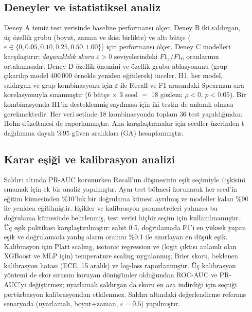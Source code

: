 \documentclass[conference]{IEEEtran}
\begin{document}
\subsection{Deneyler ve istatistiksel analiz}
Deney A temiz test verisinde baseline performansı ölçer. Deney B iki saldırgan, üç özellik grubu (boyut, zaman ve ikisi birlikte) ve altı bütçe ($\varepsilon \in \{0, 0.05, 0.10, 0.25, 0.50, 1.00\}$) için performansı ölçer. Deney C modelleri karşılaştırır; \emph{dayanıklılık skoru} $\varepsilon>0$ seviyelerindeki $F1_\varepsilon / F1_0$ oranlarının ortalamasıdır. Deney D özellik önemini ve özellik grubu ablasyonunu (grup çıkarılıp model 400\,000 örnekle yeniden eğitilerek) inceler. H1, her model, saldırgan ve grup kombinasyonu için $\varepsilon$ ile Recall ve F1 arasındaki Spearman sıra korelasyonuyla sınanmıştır (6 bütçe $\times$ 3 seed $=$ 18 gözlem; $\rho<0$, $p<0.05$). Bir kombinasyonda H1'in desteklenmiş sayılması için iki testin de anlamlı olması gerekmektedir. Her veri setinde 18 kombinasyonda toplam 36 test yapıldığından Holm düzeltmesi de raporlanmıştır. Ana karşılaştırmalar için seedler üzerinden t dağılımına dayalı \%95 güven aralıkları (GA) hesaplanmıştır.

\subsection{Karar eşiği ve kalibrasyon analizi}
Saldırı altında PR-AUC korunurken Recall'un düşmesinin eşik seçimiyle ilişkisini sınamak için ek bir analiz yapılmıştır. Aynı test bölmesi korunarak her seed'in eğitim kümesinden \%10'luk bir doğrulama kümesi ayrılmış ve modeller kalan \%90 ile yeniden eğitilmiştir. Eşikler ve kalibrasyon parametreleri yalnızca bu doğrulama kümesinde belirlenmiş, test verisi hiçbir seçim için kullanılmamıştır. Üç eşik politikası karşılaştırılmıştır: sabit 0.5, doğrulamada F1'i en yüksek yapan eşik ve doğrulamada yanlış alarm oranını \%0.1 ile sınırlayan en düşük eşik. Kalibrasyon için Platt scaling, isotonic regression ve (logit çıktısı anlamlı olan XGBoost ve MLP için) temperature scaling uygulanmış; Brier skoru, beklenen kalibrasyon hatası (ECE, 15 aralık) ve log-loss raporlanmıştır. Üç kalibrasyon yöntemi de skor sırasını koruyan dönüşümler olduğundan ROC-AUC ve PR-AUC'yi değiştirmez; uyarlamalı saldırgan da skoru en aza indirdiği için seçtiği pertürbasyon kalibrasyondan etkilenmez. Saldırı altındaki değerlendirme referans senaryoda (uyarlamalı, boyut+zaman, $\varepsilon=0.5$) yapılmıştır.
\end{document}

